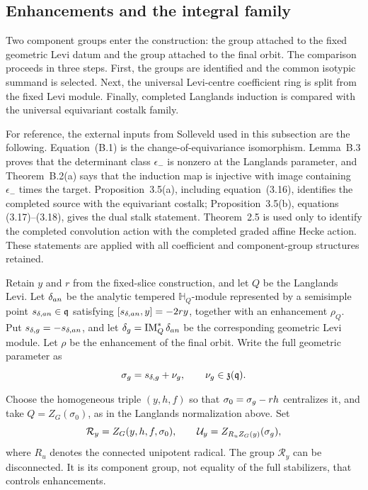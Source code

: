 \documentclass[10pt,a4paper]{amsart}
\newcommand{\Hh}{\mathbb H}
\begin{document}
\subsection{Enhancements and the integral family}

Two component groups enter the construction: the group attached to the
fixed geometric Levi datum and the group attached to the final orbit.  The
comparison proceeds in three steps.  First, the groups are identified and
the common isotypic summand is selected.  Next, the universal Levi-centre
coefficient ring is split from the fixed Levi module.  Finally, completed
Langlands induction is compared with the universal equivariant costalk
family.

For reference, the external inputs from Solleveld used in this subsection
are the following.  Equation~(B.1) is the change-of-equivariance
isomorphism.  Lemma~B.3 proves that the determinant class $\epsilon_-$ is
nonzero at the Langlands parameter, and Theorem~B.2(a) says that the
induction map is injective with image containing $\epsilon_-$ times the
target.  Proposition~3.5(a), including equation~(3.16), identifies the
completed source with the equivariant costalk; Proposition~3.5(b), equations
(3.17)--(3.18), gives the dual stalk statement.  Theorem~2.5 is used only to
identify the completed convolution action with the completed graded affine
Hecke action.  These statements are applied with all coefficient and
component-group structures retained.

Retain $y$ and $r$ from the fixed-slice construction, and let $Q$ be the
Langlands Levi.  Let $\delta_{\rm an}$ be the analytic tempered
$\Hh_Q$-module represented by a semisimple point
$s_{\delta,{\rm an}}\in\mathfrak q$ satisfying
$[s_{\delta,{\rm an}},y]=-2ry$, together with an enhancement $\rho_Q$.
Put
$s_{\delta,{\rm g}}=-s_{\delta,{\rm an}}$, and let
$\delta_{\rm g}=\operatorname{IM}_Q^*\delta_{\rm an}$ be the corresponding
geometric Levi module.  Let $\rho$ be the enhancement of the final orbit.
Write the full
geometric parameter as
\[
 \sigma_{\rm g}=s_{\delta,{\rm g}}+\nu_{\rm g},
 \qquad \nu_{\rm g}\in\mathfrak z(\mathfrak q).
\]

Choose the homogeneous triple $(y,h,f)$ so that
$\sigma_0=\sigma_{\rm g}-rh$ centralizes it, and take
$Q=Z_G(\sigma_0)$, as in the Langlands normalization above.  Set
\[
 \mathcal R_y=Z_G(y,h,f,\sigma_0),\qquad
 \mathcal U_y=Z_{R_uZ_G(y)}(\sigma_{\rm g}),
\]
where $R_u$ denotes the connected unipotent radical.  The group
$\mathcal R_y$ can be disconnected.  It is its component group,
not equality of the full stabilizers, that controls enhancements.
\end{document}
